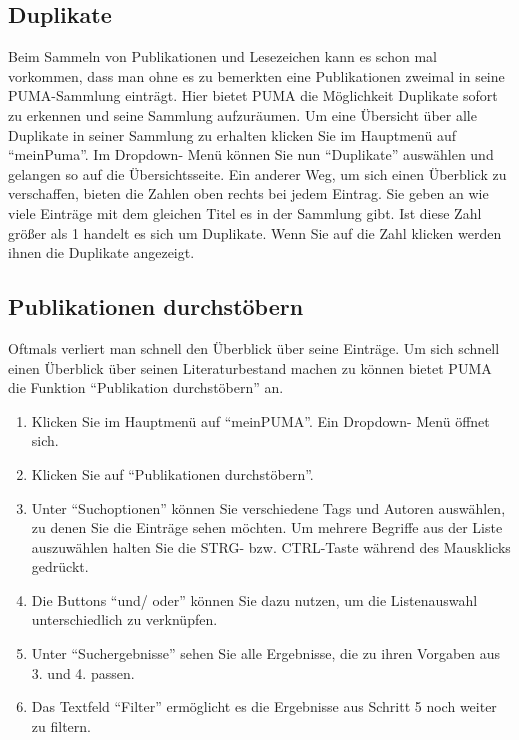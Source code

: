\documentclass[a4paper,11pt,twoside]{scrbook}
\begin{document}
\subsection{Duplikate}
Beim Sammeln von Publikationen und Lesezeichen kann es schon mal vorkommen, dass man ohne es zu bemerkten eine Publikationen zweimal in seine PUMA-Sammlung einträgt. Hier bietet PUMA die Möglichkeit Duplikate sofort zu erkennen und seine Sammlung aufzuräumen. Um eine Übersicht über alle Duplikate in seiner Sammlung zu erhalten klicken Sie im Hauptmenü auf \enquote{meinPuma}. Im Dropdown- Menü können Sie nun \enquote{Duplikate} auswählen und gelangen so auf die Übersichtsseite. Ein anderer Weg, um sich einen Überblick zu verschaffen, bieten die Zahlen oben rechts bei jedem Eintrag. Sie geben an wie viele Einträge mit dem gleichen Titel es in der Sammlung gibt. Ist diese Zahl größer als 1 handelt es sich um Duplikate. Wenn Sie auf die Zahl klicken werden ihnen die Duplikate angezeigt.
\subsection{Publikationen durchstöbern}
Oftmals verliert man schnell den Überblick über seine Einträge. Um sich schnell einen Überblick über seinen Literaturbestand machen zu können bietet PUMA die Funktion \enquote{Publikation durchstöbern} an. 
\begin{enumerate}
    \item Klicken Sie im Hauptmenü auf \enquote{meinPUMA}. Ein Dropdown- Menü öffnet sich.
    \item Klicken Sie auf \enquote{Publikationen durchstöbern}.
    \item Unter \enquote{Suchoptionen} können Sie verschiedene Tags und Autoren auswählen, zu denen Sie die Einträge sehen möchten. Um mehrere Begriffe aus der Liste auszuwählen halten Sie die STRG- bzw. CTRL-Taste während des Mausklicks gedrückt.
    \item Die Buttons \enquote{und/ oder} können Sie dazu nutzen, um die Listenauswahl unterschiedlich zu verknüpfen. 
    \item Unter \enquote{Suchergebnisse} sehen Sie alle Ergebnisse, die zu ihren Vorgaben aus 3. und 4. passen.
    \item Das Textfeld \enquote{Filter} ermöglicht es die Ergebnisse aus Schritt 5 noch weiter zu filtern.
\end{enumerate}
\end{document}
